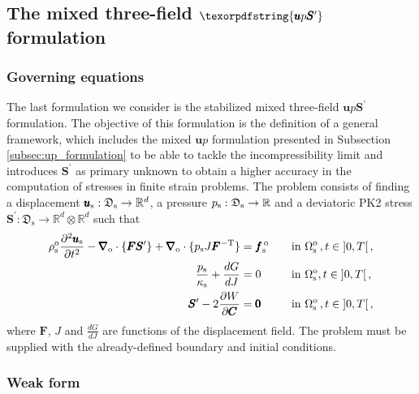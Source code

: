 \documentclass[11pt,english]{article}
\def\usolid{\pmb{u}_{\rm{s}}}                   %
\def\psolid{p_{\rm{s}}}                         %
\def\devPK{\pmb{S}^\prime}                      %
\def\testpsolid{\breve{p}_{\rm{s}}}             %
\def\psolidinc{\delta p_{\rm{s}}}                         %
\def\u{{\pmb u}}                            %
\def\F{\pmb{F}}                             %
\def\C{\pmb{C}}                             %
\def\invFtrans{\pmb{F}^{-\rm{T}}}           %
\def\dGdJ{\frac{dG}{dJ}}                    %
\def\dWdC{\frac{\partial W}{\partial \C}}   %
\def\domainsolidreference{\Omega_{\rm{s}}^{\rm{o}}}  %
\def\bodyfsolid{\pmb{f}_{\rm{s}}^{\,\rm{o}}}        %
\def\grad{\pmb{\nabla}_{\rm{o}}}        %
\def\div{\grad \cdot}                   %
\def\denssolid{\rho_{\rm{s}}^{\rm{o}}}  %
\def\kappasolid{\kappa_{\rm{s}}}        %
\def\ups{\pmb{u} p \devPK}
\def\up{\pmb{u} p}
\def\timeint{\left ] 0,T\right[}                         %
\def\dudt{\frac{\partial \usolid}{\partial t}}          %
\def\dudt2{\frac{\partial^2 \usolid}{\partial t^2}}     %
\begin{document}

\subsection{The mixed three-field $\texorpdfstring{\ups}~$ formulation\label{subsec:ups_formulation}}

\subsubsection{Governing equations\label{subsubsec:ups_formulation_governing}}

The last formulation we consider is the stabilized mixed three-field $\ups$ formulation. The objective of this formulation is the definition of a general framework, which includes the mixed $\up$ formulation presented in Subsection \ref{subsec:up_formulation} to be able to tackle the incompressibility limit and introduces $\devPK$ as primary unknown to obtain a higher accuracy in the computation of stresses in finite strain problems. The problem consists of finding a displacement $\usolid:\mathfrak{D}_{\mathrm{s}} \to \mathbb{R}^d$, a pressure $\psolid:\mathfrak{D}_{\mathrm{s}} \to \mathbb{R}$ and a deviatoric PK2 stress $\devPK:\mathfrak{D}_{\mathrm{s}} \to \mathbb{R}^{d}\otimes\mathbb{R}^{d}$ such that
\begin{align}
\denssolid \dudt2 - \div \lbrace \F \devPK \rbrace + \div \lbrace \psolid J \invFtrans \rbrace &= \bodyfsolid \quad && \hbox{in}~\domainsolidreference\,, t \in \timeint, \label{eq:sol_conservation_linear_momentum_ups} \\
 \frac{\psolid}{\kappasolid} + \dGdJ &= 0 \quad && \hbox{in}~\domainsolidreference, t \in \timeint, \label{eq:sol_constitutive_volumetric_law_ups} \\
 \devPK - 2\dWdC &= \pmb{0} \quad && \hbox{in}~\domainsolidreference\,, t \in \timeint, \label{eq:sol_constitutive_deviatoric_law_ups}
 \end{align}
where $\F$, $J$ and $\dGdJ$ are functions of the displacement field. The problem must be supplied with the already-defined boundary and initial conditions.

\subsubsection{Weak form\label{subsubsec:ups_formulation_weakform}}
\end{document}
